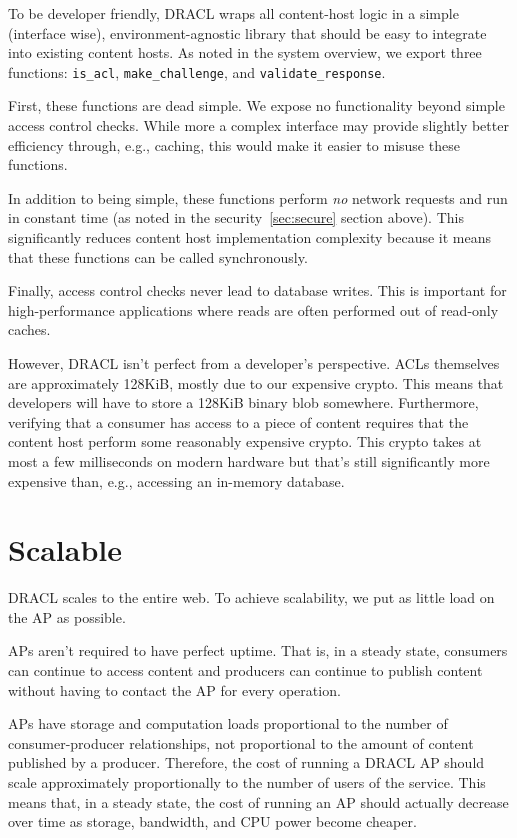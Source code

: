 \documentclass[pdftex,12pt,a4papaer,twoside,notitlepage]{report}
\begin{document}
To be developer friendly, DRACL wraps all content-host logic in a simple
(interface wise), environment-agnostic library that should be easy to integrate
into existing content hosts. As noted in the system overview, we export three
functions: \verb=is_acl=, \verb=make_challenge=, and \verb=validate_response=.

First, these functions are dead simple. We expose no functionality beyond simple
access control checks. While more a complex interface may provide slightly better
efficiency through, e.g., caching, this would make it easier to misuse these
functions.

In addition to being simple, these functions perform \emph{no} network requests
and run in constant time (as noted in the security~\cref{sec:secure} section
above). This significantly reduces content host implementation complexity
because it means that these functions can be called synchronously.

Finally, access control checks never lead to database writes. This is important
for high-performance applications where reads are often performed out of
read-only caches.

However, DRACL isn't perfect from a developer's perspective. ACLs themselves are
approximately 128KiB, mostly due to our expensive crypto. This means that
developers will have to store a 128KiB binary blob somewhere. Furthermore,
verifying that a consumer has access to a piece of content requires that the
content host perform some reasonably expensive crypto. This crypto takes at most
a few milliseconds on modern hardware but that's still significantly more
expensive than, e.g., accessing an in-memory database.

\section{Scalable}

DRACL scales to the entire web. To achieve scalability, we put as little load on
the AP as possible.

APs aren't required to have perfect uptime. That is, in a steady state,
consumers can continue to access content and producers can continue to publish
content without having to contact the AP for every operation.

APs have storage and computation loads proportional to the number of
consumer-producer relationships, not proportional to the amount of content
published by a producer. Therefore, the cost of running a DRACL AP should scale
approximately proportionally to the number of users of the service. This means
that, in a steady state, the cost of running an AP should actually decrease over
time as storage, bandwidth, and CPU power become cheaper.
\end{document}
